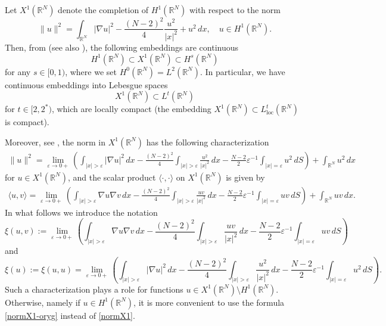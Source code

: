 \documentclass[12pt,leqno,twoside,sort]{amsart}
\newcommand{\R}{\mathbb{R}}
\numberwithin{equation}{section}
\newcommand{\loc}{\mathrm{loc}}
\begin{document}
Let $X^1 (\R^N)$ denote the completion of $H^1 (\R^N)$ with respect to the norm
\begin{equation}\label{normX1-oryg}
\| u \|^2 = \int_{\R^N} |\nabla u|^2 - \frac{(N-2)^2}{4} \frac{u^2}{|x|^2} + u^2\, dx, \quad u \in H^1 (\R^N).
\end{equation}
Then, from \cite[Theorem 1.2]{Frank} (see also \cite{Suzuki}), the following embeddings are continuous
$$
H^1 (\R^N) \subset X^1 (\R^N) \subset H^s(\R^N)
$$
for any $s \in [0, 1)$, where we set $H^0 (\R^N) = L^2 (\R^N)$. In particular, we have continuous embeddings into Lebesgue spaces
\begin{equation}\label{eq:embeddings}
X^1 (\R^N) \subset L^t (\R^N)
\end{equation}
for $t \in [2, 2^*)$, which are locally compact (the embedding $X^1 (\R^N) \subset L^t_{\loc} (\R^N)$ is compact).

Moreover, see \cite{TrachanasZographopoulos, TrachanasZographopoulosCor, VazquezZ}, the norm in $X^1 (\mathbb{R}^N)$ has the following characterization
\begin{align}\label{normX1}
\|u\|^2 = \lim_{\varepsilon \to 0+} \left( \int_{|x| > \varepsilon} |\nabla u|^2 \, dx - \frac{(N-2)^2}{4} \int_{|x| > \varepsilon} \frac{u^2}{|x|^2} \, dx - \frac{N-2}{2} \varepsilon^{-1} \int_{|x|=\varepsilon} u^2 \, dS \right) + \int_{\R^N} u^2 \, dx
\end{align}
for $u \in X^1 (\mathbb{R}^N)$, and the scalar product $\langle \cdot, \cdot \rangle$ on $X^1 (\R^N)$ is given by
\begin{align*}
\langle u,v \rangle = \lim_{\varepsilon \to 0+} \left( \int_{|x| > \varepsilon} \nabla u \nabla v \, dx - \frac{(N-2)^2}{4} \int_{|x| > \varepsilon} \frac{u v}{|x|^2} \, dx - \frac{N-2}{2} \varepsilon^{-1} \int_{|x|=\varepsilon} u v \, dS \right) + \int_{\R^N} uv \, dx.
\end{align*}
In what follows we introduce the notation
\begin{equation}\label{xi:uv}
\xi(u, v) := \lim_{\varepsilon \to 0+} \left( \int_{|x| > \varepsilon} \nabla u \nabla v \, dx - \frac{(N-2)^2}{4} \int_{|x| > \varepsilon} \frac{u v}{|x|^2} \, dx - \frac{N-2}{2} \varepsilon^{-1} \int_{|x|=\varepsilon} u v \, dS \right)
\end{equation}
and
$$
\xi(u) := \xi(u,u) = \lim_{\varepsilon \to 0+} \left( \int_{|x| > \varepsilon} |\nabla u|^2 \, dx - \frac{(N-2)^2}{4} \int_{|x| > \varepsilon} \frac{u^2}{|x|^2} \, dx - \frac{N-2}{2} \varepsilon^{-1} \int_{|x|=\varepsilon} u^2 \, dS \right).
$$
Such a characterization plays a role for functions $u \in X^1 (\R^N) \setminus H^1 (\R^N)$. Otherwise, namely if $u \in H^1 (\R^N)$, it is more convenient to use the formula \eqref{normX1-oryg} instead of \eqref{normX1}.
\end{document}
